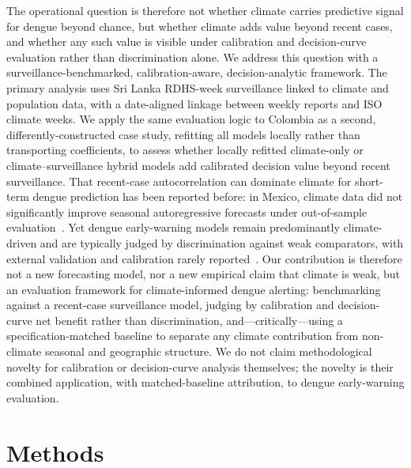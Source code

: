 \documentclass[11pt,a4paper]{article}
\begin{document}
The operational question is therefore not whether climate carries predictive signal for dengue beyond chance, but whether climate adds value beyond recent cases, and whether any such value is visible under calibration and decision-curve evaluation rather than discrimination alone. We address this question with a surveillance-benchmarked, calibration-aware, decision-analytic framework. The primary analysis uses Sri Lanka RDHS-week surveillance linked to climate and population data, with a date-aligned linkage between weekly reports and ISO climate weeks. We apply the same evaluation logic to Colombia as a second, differently-constructed case study, refitting all models locally rather than transporting coefficients, to assess whether locally refitted climate-only or climate--surveillance hybrid models add calibrated decision value beyond recent surveillance. That recent-case autocorrelation can dominate climate for short-term dengue prediction has been reported before: in Mexico, climate data did not significantly improve seasonal autoregressive forecasts under out-of-sample evaluation~\cite{Johansson2016}. Yet dengue early-warning models remain predominantly climate-driven and are typically judged by discrimination against weak comparators, with external validation and calibration rarely reported~\cite{Leung2022,HussainAlkhateeb2021}. Our contribution is therefore not a new forecasting model, nor a new empirical claim that climate is weak, but an evaluation framework for climate-informed dengue alerting: benchmarking against a recent-case surveillance model, judging by calibration and decision-curve net benefit rather than discrimination, and---critically---using a specification-matched baseline to separate any climate contribution from non-climate seasonal and geographic structure. We do not claim methodological novelty for calibration or decision-curve analysis themselves; the novelty is their combined application, with matched-baseline attribution, to dengue early-warning evaluation.

\section{Methods}
\end{document}
